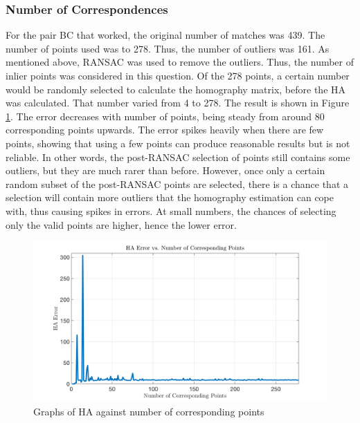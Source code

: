 \documentclass[a4paper, 10pt, conference]{ieeeconf}
\begin{document}


\subsubsection{Number of Correspondences}


For the pair BC that worked, the original number of matches was 439. The number of points used was to 278. Thus, the number of outliers was 161. As mentioned above, RANSAC was used to remove the outliers. Thus, the number of inlier points was considered in this question. Of the 278 points, a certain number would be randomly selected to calculate the homography matrix, before the HA was calculated. That number varied from 4 to 278. The result is shown in Figure \ref{fig:outliers}. The error decreases with number of points, being steady from around 80 corresponding points upwards. The error spikes heavily when there are few points, showing that using a few points can produce reasonable results but is not reliable. In other words, the post-RANSAC selection of points still contains some outliers, but they are much rarer than before. However, once only a certain random subset of the post-RANSAC points are selected, there is a chance that a selection will contain more outliers that the homography estimation can cope with, thus causing spikes in errors. At small numbers, the chances of selecting only the valid points are higher, hence the lower error.


\begin{figure}[!ht]
  \centering
  \includegraphics[width=\linewidth]{pic/q2_1_c}
  \caption{Graphs of HA against number of corresponding points}
  \label{fig:outliers}
\end{figure}
\end{document}
